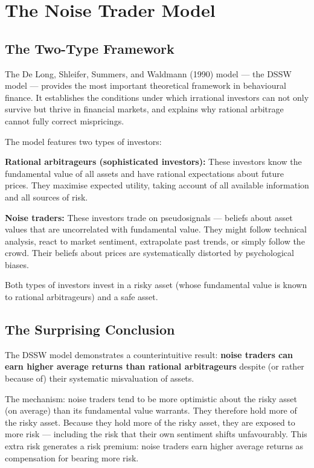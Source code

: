 \documentclass[12pt, letterpaper]{article}
\begin{document}
\newpage


\section{The Noise Trader Model}



\subsection{The Two-Type Framework}


The De Long, Shleifer, Summers, and Waldmann (1990) model --- the DSSW model --- provides the most important theoretical framework in behavioural finance. It establishes the conditions under which irrational investors can not only survive but thrive in financial markets, and explains why rational arbitrage cannot fully correct mispricings.

The model features two types of investors:

\textbf{Rational arbitrageurs (sophisticated investors):} These investors know the fundamental value of all assets and have rational expectations about future prices. They maximise expected utility, taking account of all available information and all sources of risk.

\textbf{Noise traders:} These investors trade on pseudosignals --- beliefs about asset values that are uncorrelated with fundamental value. They might follow technical analysis, react to market sentiment, extrapolate past trends, or simply follow the crowd. Their beliefs about prices are systematically distorted by psychological biases.

Both types of investors invest in a risky asset (whose fundamental value is known to rational arbitrageurs) and a safe asset.


\subsection{The Surprising Conclusion}


The DSSW model demonstrates a counterintuitive result: \textbf{noise traders can earn higher average returns than rational arbitrageurs} despite (or rather because of) their systematic misvaluation of assets.

The mechanism: noise traders tend to be more optimistic about the risky asset (on average) than its fundamental value warrants. They therefore hold more of the risky asset. Because they hold more of the risky asset, they are exposed to more risk --- including the risk that their own sentiment shifts unfavourably. This extra risk generates a risk premium: noise traders earn higher average returns as compensation for bearing more risk.
\end{document}
